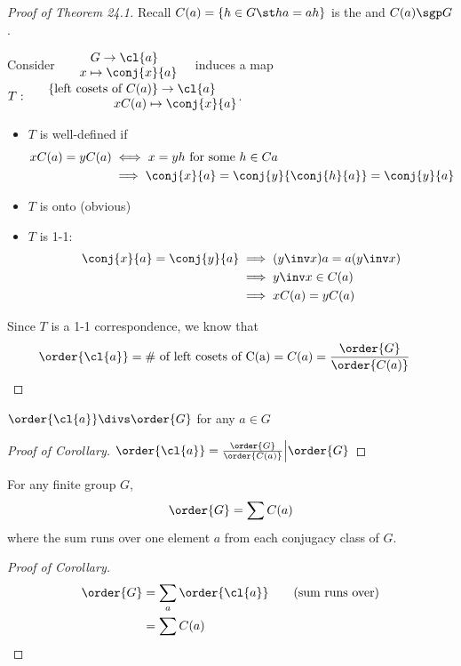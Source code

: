 \begin{proof}[Proof of Theorem 24.1]
Recall \(C(a) = \{h\in G \st ha=ah\}\) is the  and \(C(a)\sgp G\).

Consider \( \quad\begin{matrix}
    G\to \cl{a} \\
    \ \ x\mapsto \conj{x}{a}
\end{matrix}\quad \) induces a map \(T:\begin{matrix}
    \{\text{left cosets of } C(a)\} \to \cl{a} \\
    \qquad \qquad \qquad \quad xC(a) \mapsto \conj{x}{a}
\end{matrix}\).

\begin{itemize}
    \item \(T\) is well-defined if \begin{align*}
        xC(a) = yC(a) &\iff x=yh \text{ for some } h\in C{a} \\
            &\implies \conj{x}{a} = \conj{y}{\conj{h}{a}} = \conj{y}{a}
    \end{align*}
    \item \(T\) is onto (obvious)
    \item \(T\) is 1-1: \begin{align*}
        \conj{x}{a} = \conj{y}{a} &\implies (y\inv x)a = a(y\inv x) \\
        &\implies y\inv x \in C(a) \\
        &\implies xC(a) = yC(a)
    \end{align*}
\end{itemize}
Since \(T\) is a 1-1 correspondence, we know that \begin{align*}
    \order{\cl{a}} &= \text{\# of left cosets of C(a)} = \index{G}{C(a)} = \frac{\order{G}}{\order{C(a)}}
\end{align*}
\end{proof}

\begin{corollary}
  \(\order{\cl{a}}\divs \order{G}\) for any \(a\in G\)
\end{corollary}

\begin{proof}[Proof of Corollary]
    \(\order{\cl{a}} = \frac{\order{G}}{\order{C(a)}} \Big\vert \order{G}\)
\end{proof}

\begin{corollary}
  For any finite group \(G\), \begin{align*}
    \order{G} = \sum \index{G}{C(a)}
  \end{align*}
  where the sum runs over one element \(a\) from each conjugacy class of \(G\).
\end{corollary}
\begin{proof}[Proof of Corollary]
    \begin{align*}
        \order{G} &= \sum_a \order{\cl{a}}\qquad\text{(sum runs over)} \\
        &= \sum \index{G}{C(a)}
    \end{align*}
\end{proof}

